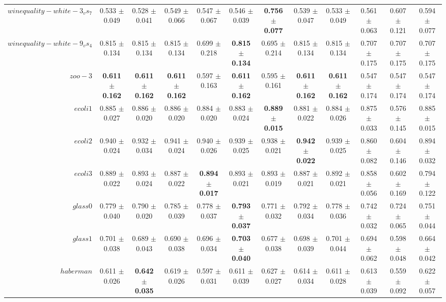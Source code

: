 \begin{table}[!ht]
{\begin{tabular}{r c c c c c c c c c c c}
$winequality-white-3_vs_7$ & 0.533 $\pm$ 0.049 & 0.528 $\pm$ 0.041 & 0.549 $\pm$ 0.066 & 0.547 $\pm$ 0.067 & 0.546 $\pm$ 0.039 & \textbf{0.756 $\pm$ 0.077} & 0.539 $\pm$ 0.047 & 0.533 $\pm$ 0.049 & 0.561 $\pm$ 0.063 & 0.607 $\pm$ 0.121 & 0.594 $\pm$ 0.077 \\
$winequality-white-9_vs_4$ & 0.815 $\pm$ 0.134 & 0.815 $\pm$ 0.134 & 0.815 $\pm$ 0.134 & 0.699 $\pm$ 0.218 & \textbf{0.815 $\pm$ 0.134} & 0.695 $\pm$ 0.214 & 0.815 $\pm$ 0.134 & 0.815 $\pm$ 0.134 & 0.707 $\pm$ 0.175 & 0.707 $\pm$ 0.175 & 0.707 $\pm$ 0.175 \\
$zoo-3$ & \textbf{0.611 $\pm$ 0.162} & \textbf{0.611 $\pm$ 0.162} & \textbf{0.611 $\pm$ 0.162} & 0.597 $\pm$ 0.163 & \textbf{0.611 $\pm$ 0.162} & 0.595 $\pm$ 0.161 & \textbf{0.611 $\pm$ 0.162} & \textbf{0.611 $\pm$ 0.162} & 0.547 $\pm$ 0.174 & 0.547 $\pm$ 0.174 & 0.547 $\pm$ 0.174 \\
$ecoli1$ & 0.885 $\pm$ 0.027 & 0.886 $\pm$ 0.020 & 0.886 $\pm$ 0.020 & 0.884 $\pm$ 0.020 & 0.883 $\pm$ 0.024 & \textbf{0.889 $\pm$ 0.015} & 0.881 $\pm$ 0.022 & 0.884 $\pm$ 0.026 & 0.875 $\pm$ 0.033 & 0.576 $\pm$ 0.145 & 0.885 $\pm$ 0.015 \\
$ecoli2$ & 0.940 $\pm$ 0.024 & 0.932 $\pm$ 0.034 & 0.941 $\pm$ 0.024 & 0.940 $\pm$ 0.026 & 0.939 $\pm$ 0.025 & 0.938 $\pm$ 0.021 & \textbf{0.942 $\pm$ 0.022} & 0.939 $\pm$ 0.025 & 0.860 $\pm$ 0.082 & 0.604 $\pm$ 0.146 & 0.894 $\pm$ 0.032 \\
$ecoli3$ & 0.889 $\pm$ 0.022 & 0.893 $\pm$ 0.024 & 0.887 $\pm$ 0.022 & \textbf{0.894 $\pm$ 0.017} & 0.893 $\pm$ 0.021 & 0.893 $\pm$ 0.019 & 0.887 $\pm$ 0.021 & 0.892 $\pm$ 0.021 & 0.858 $\pm$ 0.056 & 0.602 $\pm$ 0.169 & 0.794 $\pm$ 0.122 \\
$glass0$ & 0.779 $\pm$ 0.040 & 0.790 $\pm$ 0.020 & 0.785 $\pm$ 0.039 & 0.778 $\pm$ 0.037 & \textbf{0.793 $\pm$ 0.037} & 0.771 $\pm$ 0.032 & 0.792 $\pm$ 0.034 & 0.778 $\pm$ 0.036 & 0.742 $\pm$ 0.032 & 0.724 $\pm$ 0.065 & 0.751 $\pm$ 0.044 \\
$glass1$ & 0.701 $\pm$ 0.038 & 0.689 $\pm$ 0.043 & 0.690 $\pm$ 0.038 & 0.696 $\pm$ 0.034 & \textbf{0.703 $\pm$ 0.040} & 0.677 $\pm$ 0.038 & 0.698 $\pm$ 0.039 & 0.701 $\pm$ 0.044 & 0.694 $\pm$ 0.062 & 0.598 $\pm$ 0.048 & 0.664 $\pm$ 0.042 \\
$haberman$ & 0.611 $\pm$ 0.026 & \textbf{0.642 $\pm$ 0.035} & 0.619 $\pm$ 0.026 & 0.597 $\pm$ 0.031 & 0.611 $\pm$ 0.039 & 0.627 $\pm$ 0.027 & 0.614 $\pm$ 0.034 & 0.611 $\pm$ 0.028 & 0.613 $\pm$ 0.039 & 0.559 $\pm$ 0.092 & 0.622 $\pm$ 0.057 \\

\end{tabular}}
\end{table}
